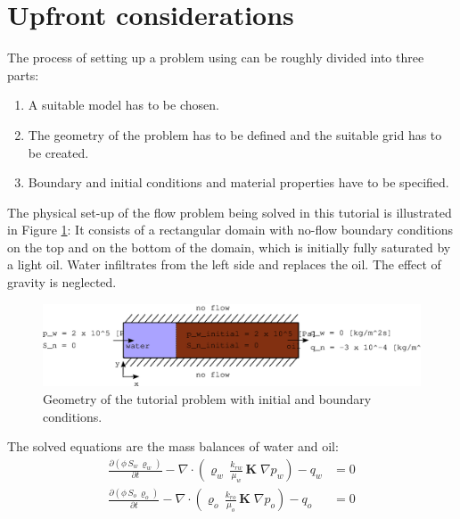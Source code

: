 \section{Upfront considerations}
\label{tutorial1}

The process of setting up a problem using \eWoms can be roughly
divided into three parts:
\begin{enumerate}
\item A suitable model has to be chosen.
\item The geometry of the problem has to be defined and the suitable
  grid has to be created.
\item Boundary and initial conditions and material properties have to
  be specified.
\end{enumerate}

The physical set-up of the flow problem being solved in this tutorial
is illustrated in Figure \ref{tutorial1:problemfigure}: It
consists of a rectangular domain with no-flow boundary conditions on
the top and on the bottom of the domain, which is initially fully
saturated by a light oil. Water infiltrates from the left side and
replaces the oil. The effect of gravity is neglected.

\begin{figure}[ht]
\centering
\includegraphics[width=0.9\linewidth,keepaspectratio]{EPS/tutorial-problemconfiguration}
\caption{Geometry of the tutorial problem with initial and boundary conditions.}\label{tutorial1:problemfigure}
\end{figure}

The solved equations are the mass balances of water and oil:
\begin{align}
  \label{massbalancewater}
  \frac {\partial (\phi \, S_{w}\, \varrho_{w})}{\partial t}
  -
  \nabla \cdot \left( \varrho_{w} \, \frac{k_{rw}}{\mu_{w}} \, \mathbf{K}\;\nabla p_w \right)
  -
  q_w
  & =
  0 \\
  \label{massbalanceoil}
  \frac {\partial (\phi \, S_{o}\, \varrho_{o})}{\partial t}
  -
  \nabla \cdot \left( \varrho_{o} \, \frac{k_{ro}}{\mu_{o}} \, \mathbf{K}\;\nabla p_o \right)
  -
  q_o
  & =
  0
\end{align}

